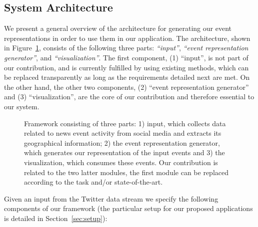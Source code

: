 \subsection{System Architecture}\label{sec:framework}
We present a general overview of the architecture for generating our event
representations in order to use them in our application.  The architecture, shown in Figure~\ref{fig:sys_architecture},
consists of the following three parts: {\em ``input''}, {\em ``event
representation generator''}, and {\em
``visualization''}.  The first component, (1) ``input'', is not part of our contribution, and
is currently fulfilled by using existing methods, which
can be replaced transparently as long as the requirements detailed
next are met. On the other hand, the other two components, (2) ``event
representation generator'' and (3) ``visualization'', are the core of our
contribution and therefore essential to our system.


\begin{figure}[b]
    \caption{Framework consisting of three parts: 1) input,
    which collects data related to news event activity from social media and extracts
    its geographical
    information; 2) the event representation generator, which generates our
    representation of
    the input events and 3) the visualization, which consumes these events.
    Our contribution is related to the two latter modules, the first module
    can be replaced according to the task and/or
    state-of-the-art.}
    \label{fig:sys_architecture}
\end{figure}

Given an input from the Twitter data stream we specify the following components of our
framework (the particular setup for our proposed applications is
detailed in Section~\ref{sec:setup}):

